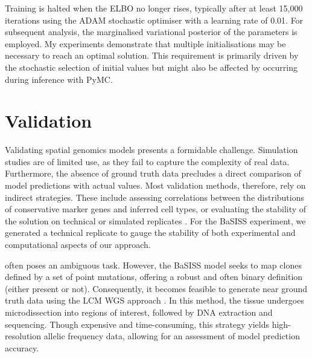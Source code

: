 Training is halted when the \ac{ELBO} no longer rises, typically after at least 15,000 iterations using the ADAM stochastic optimiser \parencite{Kingma2014-um} with a learning rate of 0.01. For subsequent analysis, the marginalised variational posterior of the parameters is employed. My experiments demonstrate that multiple initialisations may be necessary to reach an optimal solution. This requirement is primarily driven by the stochastic selection of initial values but might also be affected by  occurring during inference with \ac{PyMC}.

\section{Validation}
\label{sec:bassis-validation}
Validating spatial genomics models presents a formidable challenge. Simulation studies are of limited use, as they fail to capture the complexity of real data. Furthermore, the absence of ground truth data precludes a direct comparison of model predictions with actual values. Most validation methods, therefore, rely on indirect strategies. These include assessing correlations between the distributions of conservative marker genes and inferred cell types, or evaluating the stability of the solution on technical or simulated replicates \parencite{Li2023-ik}. For the \ac{BaSISS} experiment, we generated a technical replicate to gauge the stability of both experimental and computational aspects of our approach.

 often poses an ambiguous task. However, the \ac{BaSISS} model seeks to map clones defined by a set of point mutations, offering a robust and often binary definition (either present or not). Consequently, it becomes feasible to generate near ground truth data using the \ac{LCM} \ac{WGS} approach \parencite{Shen2000-xj}. In this method, the tissue undergoes microdissection into regions of interest, followed by DNA extraction and sequencing. Though expensive and time-consuming, this strategy yields high-resolution allelic frequency data, allowing for an assessment of model prediction accuracy.

